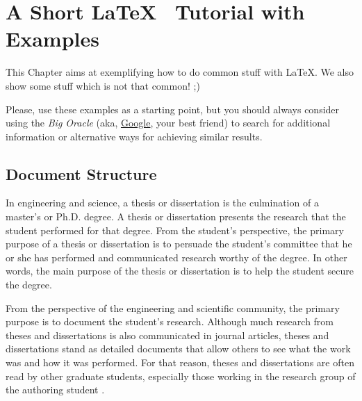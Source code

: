 % 
%  
%
\chapter{A Short \LaTeX~ Tutorial with Examples}
\label{cha:a_short_latex_tutorial_with_examples}

This Chapter aims at exemplifying how to do common stuff with \LaTeX. We also show some stuff which is not that common! ;) 

Please, use these examples as a starting point, but you should always consider using the \emph{Big Oracle} (aka, \href{http://www.google.com}{Google}, your best friend) to search for additional information or alternative ways for achieving similar results.


\section{Document Structure} %
\label{sec:document_structure}

In engineering and science, a thesis or dissertation is the culmination of a master's or Ph.D. degree. A thesis or dissertation presents the research that the student performed for that degree. From the student's perspective, the primary purpose of a thesis or dissertation is to persuade the student's committee that he or she has performed and communicated research worthy of the degree. In other words, the main purpose of the thesis or dissertation is to help the student secure the degree. 

From the perspective of the engineering and scientific community, the primary purpose is to document the student's research. Although much research from theses and dissertations is also communicated in journal articles, theses and dissertations stand as detailed documents that allow others to see what the work was and how it was performed. For that reason, theses and dissertations are often read by other graduate students, especially those working in the research group of the authoring student \cite{gustavii2016write, glasman2010science, chicago, strunk}. 
	
